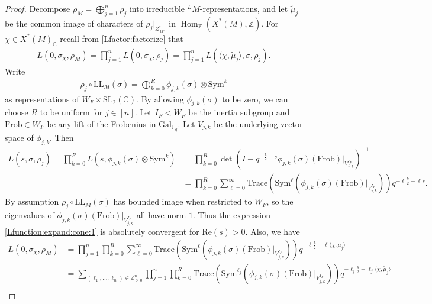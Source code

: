 \documentclass[10pt]{amsart}
\theoremstyle{definition}
\numberwithin{equation}{section}
\DeclareMathOperator{\Hom}{\mathrm{Hom}}
\numberwithin{equation}{subsection}
\newcommand{\ZZ}{\mathbb{Z}}
\newcommand{\CC}{\mathbb{C}}
\begin{document}
\begin{proof} Decompose $\rho_M = \bigoplus\limits_{j=1}^n\rho_j$ into irreducible $^LM$-representations, and let $\widetilde{\mu}_j$ be the common image of characters of $\rho_j|_{Z_{M^\lor}^\circ}$ in $\Hom_\ZZ(X^*(M),\ZZ)$. For $\chi\in X^*(M)_\CC$ recall from \eqref{Lfactor:factorize} that
\begin{align*}
    L(0,\sigma_\chi,\rho_M) = \prod_{j=1}^n L(0,\sigma_\chi,\rho_j) = \prod_{j=1}^n L(\langle\chi,\widetilde{\mu}_j\rangle,\sigma,\rho_j).
\end{align*}
 Write
\begin{align*}
    \rho_j\circ \mathrm{LL}_M(\sigma) = \bigoplus_{k=0}^R \phi_{j,k}(\sigma) \otimes\mathrm{Sym}^k 
\end{align*}
as representations of $W_F\times\mathrm{SL}_2(\CC)$. By allowing $\phi_{j,k}(\sigma)$ to be zero, we can choose $R$ to be uniform for $j\in[n]$. Let $I_F< W_F$ be the inertia subgroup and $\mathrm{Frob}\in W_F$ be any lift of the Frobenius in $\mathrm{Gal}_{\mathbb{F}_q}.$ Let $V_{j,k}$ be the underlying vector space of $\phi_{j,k}$. Then
\begin{align}\label{Lfunction:expand:cone:1}
    \nonumber L(s,\sigma,\rho_j) = \prod_{k=0}^R L(s,\phi_{j,k}(\sigma) \otimes\mathrm{Sym}^k) &= \prod_{k=0}^R \det\left(I - q^{-\frac{k}{2}-s}\phi_{j,k}(\sigma)(\mathrm{Frob})\big|_{V_{j,k}^{I_F}}\right)^{-1}\\
    &=\prod_{k=0}^R \sum_{\ell=0}^\infty \mathrm{Trace}\left(\mathrm{Sym}^\ell\left(\phi_{j,k}(\sigma)(\mathrm{Frob})\big|_{V_{j,k}^{I_F}}\right)\right)q^{-\ell\frac{k}{2}-\ell s}.
\end{align}
By assumption $\rho_j\circ \mathrm{LL}_M(\sigma)$ has bounded image when restricted to $W_F$, so the eigenvalues of $\phi_{j,k}(\sigma)(\mathrm{Frob})\big|_{V_{j,k}^{I_F}}$ all have norm $1$. Thus the expression \eqref{Lfunction:expand:cone:1} is absolutely convergent for $\mathrm{Re}(s)>0$. Also, we have
\begin{align}\label{eq:Lexpansion}
   \nonumber  L(0,\sigma_\chi,\rho_M) &= \prod_{j=1}^n\prod_{k=0}^R\sum_{\ell=0}^\infty  \mathrm{Trace}\left(\mathrm{Sym}^\ell\left(\phi_{j,k}(\sigma)(\mathrm{Frob})\big|_{V_{j,k}^{I_F}}\right)\right)q^{-\ell\frac{k}{2}-\ell \langle\chi,\widetilde{\mu}_j\rangle}\\
    \nonumber &=\sum_{(\ell_1,\ldots,\ell_n)\in\mathbb{Z}_{\geq 0}^n}\prod_{j=1}^n\prod_{k=0}^R  \mathrm{Trace}\left(\mathrm{Sym}^{\ell_j}\left(\phi_{j,k}(\sigma)(\mathrm{Frob})\big|_{V_{j,k}^{I_F}}\right)\right)q^{-\ell_j\frac{k}{2}-\ell_j \langle\chi,\widetilde{\mu}_j\rangle}\\

\end{align}
\end{proof}
\end{document}
